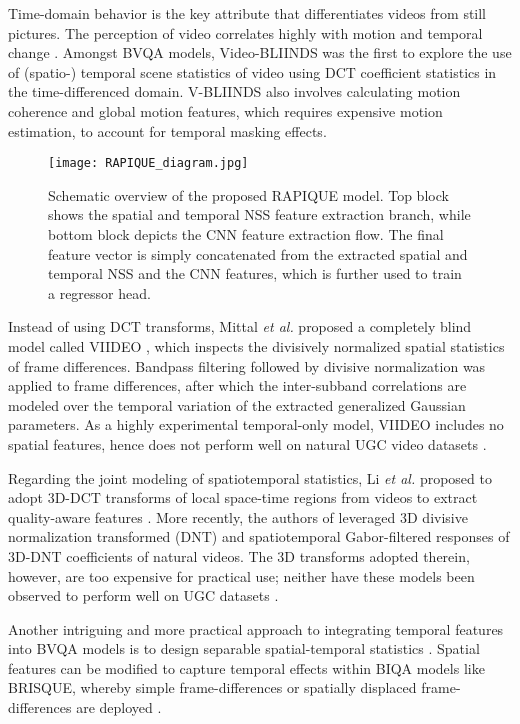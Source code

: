 \documentclass[transmag]{IEEEtran}
\begin{document}
Time-domain behavior is the key attribute that differentiates videos from still pictures. The perception of video correlates highly with motion and temporal change \cite{born2005structure}. Amongst BVQA models, Video-BLIINDS \cite{saad2014blind} was the first to explore the use of (spatio-) temporal scene statistics of video using DCT coefficient statistics in the time-differenced domain. V-BLIINDS also involves calculating motion coherence and global motion features, which requires expensive motion estimation, to account for temporal masking effects. 

\begin{figure*}[!ht]
\centering
\texttt{[image: RAPIQUE\_diagram.jpg]}
\caption{Schematic overview of the proposed RAPIQUE model. Top block shows the spatial and temporal NSS feature extraction branch, while bottom block depicts the CNN feature extraction flow. The final feature vector is simply concatenated from the extracted spatial and temporal NSS and the CNN features, which is further used to train a regressor head.}
\label{fig:rapique_flowchart}
\end{figure*}

Instead of using DCT transforms, Mittal \textit{et al.} proposed a completely blind model called VIIDEO \cite{mittal2015completely}, which inspects the divisively normalized spatial statistics of frame differences. 
Bandpass filtering followed by divisive normalization was applied to frame differences, after which the inter-subband correlations are modeled over the temporal variation of the extracted generalized Gaussian parameters. 
As a highly experimental temporal-only model, VIIDEO includes no spatial features, hence does not perform well on natural UGC video datasets \cite{hosu2017konstanz, sinno2018large}.

Regarding the joint modeling of spatiotemporal statistics, Li \textit{et al.} proposed to adopt 3D-DCT transforms of local space-time regions from videos to extract quality-aware features \cite{li2016spatiotemporal}. More recently, the authors of \cite{dendi2020no} leveraged 3D divisive normalization transformed (DNT) and spatiotemporal Gabor-filtered responses of 3D-DNT coefficients of natural videos. The 3D transforms adopted therein, however, are too expensive for practical use; neither have these models been observed to perform well on UGC datasets \cite{sinno2018large, wang2019youtube}.

Another intriguing and more practical approach to integrating temporal features into BVQA models is to design separable spatial-temporal statistics \cite{sinno2019spatio, yu2020predicting, madhusudana2020st, chen2020chroma}. Spatial features can be modified to capture temporal effects within BIQA models like BRISQUE, whereby simple frame-differences or spatially displaced frame-differences are deployed \cite{sinno2019spatio,lee2020ipas, yu2020predicting, lee2020josa}.
\end{document}
